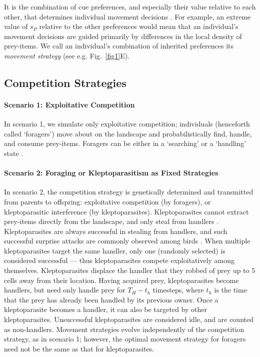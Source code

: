 It is the combination of cue preferences, and especially their value relative to each other, that determines individual movement decisions \citep[similar to relative selection coefficients,][]{fortin2005,avgar2016,white2018}. 
For example, an extreme value of $s_P$ relative to the other preferences would mean that an individual's movement decisions are guided primarily by differences in the local density of prey-items.
We call an individual's combination of inherited preferences its \textit{movement strategy} (see e.g. Fig.~\ref{fig1}E).

\subsection*{Competition Strategies}

\paragraph{Scenario 1: Exploitative Competition}

In scenario 1, we simulate only exploitative competition; individuals (henceforth called `foragers') move about on the landscape and probabilistically find, handle, and consume prey-items.
Foragers can be either in a `searching' or a `handling' state \citep{holmgren1995}.

\paragraph{Scenario 2: Foraging or Kleptoparasitism as Fixed Strategies}

In scenario 2, the competition strategy is genetically determined and transmitted from parents to offspring: exploitative competition (by foragers), or kleptoparasitic interference (by kleptoparasites).
Kleptoparasites cannot extract prey-items directly from the landscape, and only steal from handlers \citep[see][]{holmgren1995}.
Kleptoparasites are always successful in stealing from handlers, and such successful surprise attacks are commonly observed among birds \citep{brockmann1979}.
When multiple kleptoparasites target the same handler, only one (randomly selected) is considered successful --- thus kleptoparasites compete exploitatively among themselves.
Kleptoparasites displace the handler that they robbed of prey up to 5 cells away from their location.
Having acquired prey, kleptoparasites become handlers, but need only handle prey for $T_H - t_h$ timesteps, where $t_h$ is the time that the prey has already been handled by its previous owner.
Once a kleptoparasite becomes a handler, it can also be targeted by other kleptoparasites.
Unsuccessful kleptoparasites are considered idle, and are counted as non-handlers.
Movement strategies evolve independently of the competition strategy, as in scenario 1; however, the optimal movement strategy for foragers need not be the same as that for kleptoparasites.


